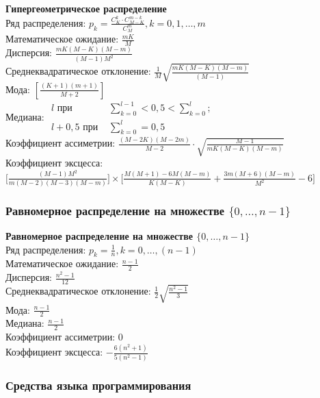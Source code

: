 \textbf{Гипергеометрическое распределение}\\ 
Ряд распределения: $p_k = \frac{C_{K}^k \cdot C_{M-K}^{m-k}}{C_{M}^m}, k=0,1, \dots, m$\\
Математическое ожидание: $\frac{mK}{M}$\\
Дисперсия: $ \frac{mK(M-K)(M-m)}{(M-1)M^2} $\\
Среднеквадратическое отклонение: $ \frac{1}{M} \sqrt{ \frac{mK(M-K)(M-m)}{(M-1)} } $\\
Мода: $[ \frac{(K+1)(m+1)}{M+2} ]$\\
Медиана: $\begin{aligned}
  l \text{ при } & \sum\limits_{k=0}^{l-1} < 0,5 < \sum\limits_{k=0}^{l};\\
  l + 0,5 \text{ при } & \sum\limits_{k=0}^{l}=0,5
\end{aligned}$\\
Коэффициент ассиметрии: $ \frac{ (M-2K)(M-2m) }{M-2} \cdot \sqrt{ \frac{M-1}{mK(M-K)(M-m)} } $\\
Коэффициент эксцесса: $ \big[ \frac{(M-1)M^2}{ m(M-2)(M-3)(M-m) } \big] \times 
\big[ \frac{ M(M+1)-6M(M-m) }{K(M-K)} + \frac{3m(M+6)(M-m)}{M^2} - 6 \big]$\\

\subsubsection{Равномерное распределение на множестве $\{0,\dots ,n-1\}$}

\textbf{Равномерное распределение на множестве $\{0,\dots ,n-1\}$}\\ 
Ряд распределения: $p_k = \frac{1}{n}, k =0, \dots , (n-1)$\\
Математическое ожидание:  $\frac{n-1}{2}$\\
Дисперсия: $\frac{n^2 - 1}{12}$\\
Среднеквадратическое отклонение: $\frac{1}{2} \sqrt{ \frac{n^2-1}{3} }$\\
Мода: $\frac{n-1}{2}$\\
Медиана: $\frac{n-1}{2}$\\
Коэффициент ассиметрии: $0$\\ 
Коэффициент эксцесса: $ - \frac{ 6(n^2+1) }{ 5(n^2 -1) } $\\


\subsubsection{Средства языка программирования}%

